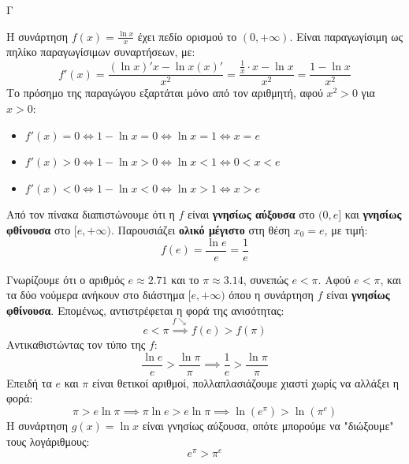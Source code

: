 \begin{thema}{Γ}
\begin{erwthma}
\item Η συνάρτηση $f(x) = \frac{\ln x}{x}$ έχει πεδίο ορισμού το $(0, +\infty)$. Είναι παραγωγίσιμη ως πηλίκο παραγωγίσιμων συναρτήσεων, με:
\[ f'(x) = \frac{(\ln x)' x - \ln x (x)'}{x^2} = \frac{\frac{1}{x} \cdot x - \ln x}{x^2} = \frac{1 - \ln x}{x^2} \]
Το πρόσημο της παραγώγου εξαρτάται μόνο από τον αριθμητή, αφού $x^2 > 0$ για $x > 0$:
\begin{itemize}
    \item $f'(x) = 0 \Leftrightarrow 1 - \ln x = 0 \Leftrightarrow \ln x = 1 \Leftrightarrow x = e$
    \item $f'(x) > 0 \Leftrightarrow 1 - \ln x > 0 \Leftrightarrow \ln x < 1 \Leftrightarrow 0 < x < e$
    \item $f'(x) < 0 \Leftrightarrow 1 - \ln x < 0 \Leftrightarrow \ln x > 1 \Leftrightarrow x > e$
\end{itemize}
\begin{center}
\end{center}
Από τον πίνακα διαπιστώνουμε ότι η $f$ είναι \textbf{γνησίως αύξουσα} στο $(0, e]$ και \textbf{γνησίως φθίνουσα} στο $[e, +\infty)$.
Παρουσιάζει \textbf{ολικό μέγιστο} στη θέση $x_0 = e$, με τιμή:
\[ f(e) = \frac{\ln e}{e} = \frac{1}{e} \]

\item Γνωρίζουμε ότι ο αριθμός $e \approx 2.71$ και το $\pi \approx 3.14$, συνεπώς $e < \pi$.
Αφού $e < \pi$, και τα δύο νούμερα ανήκουν στο διάστημα $[e, +\infty)$ όπου η συνάρτηση $f$ είναι \textbf{γνησίως φθίνουσα}. Επομένως, αντιστρέφεται η φορά της ανισότητας:
\[ e < \pi \overset{f \searrow}{\implies} f(e) > f(\pi) \]
Αντικαθιστώντας τον τύπο της $f$:
\[ \frac{\ln e}{e} > \frac{\ln \pi}{\pi} \implies \frac{1}{e} > \frac{\ln \pi}{\pi} \]
Επειδή τα $e$ και $\pi$ είναι θετικοί αριθμοί, πολλαπλασιάζουμε χιαστί χωρίς να αλλάξει η φορά:
\[ \pi > e \ln \pi \implies \pi \ln e > e \ln \pi \implies \ln(e^\pi) > \ln(\pi^e) \]
Η συνάρτηση $g(x) = \ln x$ είναι γνησίως αύξουσα, οπότε μπορούμε να "διώξουμε" τους λογάριθμους:
\[ e^\pi > \pi^e \]


\end{erwthma}
\end{thema}
